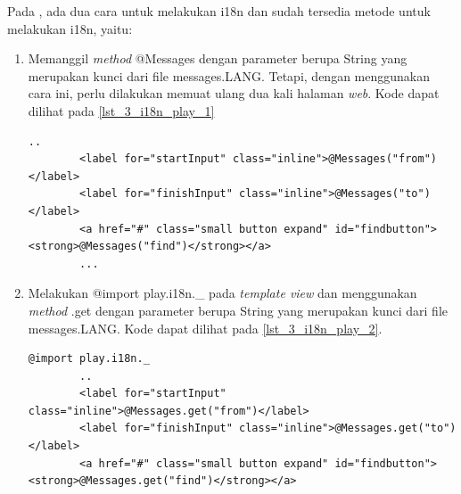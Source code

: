 Pada \play, ada dua cara untuk melakukan i18n dan sudah tersedia metode untuk melakukan i18n, yaitu:
\begin{enumerate}
	\item Memanggil \textit{method} @Messages dengan parameter berupa String yang merupakan kunci dari file messages.LANG. Tetapi, dengan menggunakan cara ini, perlu dilakukan memuat ulang dua kali halaman \textit{web}. Kode dapat dilihat pada \ref{lst_3_i18n_play_1}
	
	\begin{lstlisting}[caption=Script \play untuk Internationalization,label = {lst_3_i18n_play_1}]
		..
		<label for="startInput" class="inline">@Messages("from")</label>
		<label for="finishInput" class="inline">@Messages("to")</label>
		<a href="#" class="small button expand" id="findbutton"><strong>@Messages("find")</strong></a>
		...
	\end{lstlisting}
	
	
	\item Melakukan @import play.i18n.\_ pada \textit{template view} dan menggunakan \textit{method} \@Messages.get dengan parameter berupa String yang merupakan kunci dari file messages.LANG. Kode dapat dilihat pada \ref{lst_3_i18n_play_2}.
	
		\begin{lstlisting}[caption=Script \play untuk Internationalization,label = {lst_3_i18n_play_2}]
		@import play.i18n._
		..
		<label for="startInput" class="inline">@Messages.get("from")</label>
		<label for="finishInput" class="inline">@Messages.get("to")</label>
		<a href="#" class="small button expand" id="findbutton"><strong>@Messages.get("find")</strong></a>
	\end{lstlisting}
	
\end{enumerate}


